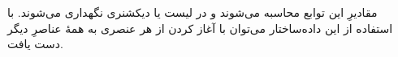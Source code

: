 مقادیرِ این توابع محاسبه می‌شوند و در لیست یا دیکشنری نگهداری می‌شوند. با استفاده از این داده‌ساختار می‌توان با آغاز کردن از هر عنصری به همهٔ عناصرِ دیگر دست یافت. 




